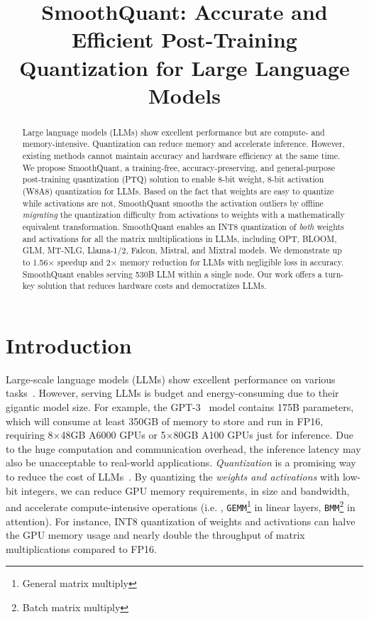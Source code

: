 \title{SmoothQuant: Accurate and Efficient Post-Training Quantization for Large Language Models}

\begin{abstract}
Large language models (LLMs) show excellent performance but are compute- and memory-intensive. Quantization can reduce memory and accelerate inference. However, existing methods cannot maintain accuracy and hardware efficiency at the same time. We propose SmoothQuant, a training-free, accuracy-preserving, and general-purpose post-training quantization (PTQ) solution to enable 8-bit weight, 8-bit activation (W8A8) quantization for LLMs. Based on the fact that weights are easy to quantize while activations are not, SmoothQuant smooths the activation outliers by offline \textit{migrating} the quantization difficulty from activations to weights with a mathematically equivalent transformation. SmoothQuant enables an INT8 quantization of \textit{both} weights and activations for all the matrix multiplications in LLMs, including OPT, BLOOM, GLM, MT-NLG, Llama-1/2, Falcon, Mistral, and Mixtral models. We demonstrate up to 1.56$\times$ speedup and 2$\times$ memory reduction for LLMs with negligible loss in accuracy. SmoothQuant enables serving 530B LLM within a single node. Our work offers a turn-key solution that reduces hardware costs and democratizes LLMs.
\end{abstract}

\section{Introduction}
Large-scale language models (LLMs) show excellent performance on various tasks~\citep{gpt3,opt}. However, serving LLMs is budget and energy-consuming due to their gigantic model size. For example, the GPT-3~\citep{gpt3} model contains 175B parameters, which will consume at least 350GB of memory to store and run in FP16, requiring 8$\times$48GB A6000 GPUs or 5$\times$80GB A100 GPUs just for inference. Due to the huge computation and communication overhead, the inference latency may also be unacceptable to real-world applications.
\emph{Quantization} is a promising way to reduce the cost of LLMs~\cite{dettmers2022llmint8, zeroquant}. By quantizing the \emph{weights and activations} with low-bit integers, we can reduce GPU memory requirements, in size and bandwidth, and accelerate compute-intensive operations (i.e. , \texttt{GEMM}\footnote{General matrix multiply} in linear layers, \texttt{BMM}\footnote{Batch matrix multiply} in attention). For instance, INT8 quantization of weights and activations can halve the GPU memory usage and nearly double the throughput of matrix multiplications compared to FP16.

